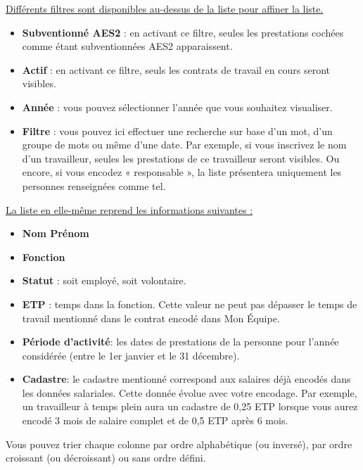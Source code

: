 \begin{info}
\underline{Différents filtres sont disponibles au-dessus de la liste pour affiner la liste.} 
\begin{itemize}
    \item \textbf{Subventionné AES2 }: en activant ce filtre, seules les prestations cochées comme étant subventionnées AES2 apparaissent.
    \item \textbf{Actif} : en activant ce filtre, seuls les contrats de travail en cours seront visibles.
    \item \textbf{Année} : vous pouvez sélectionner l’année que vous souhaitez visualiser.
    \item \textbf{Filtre} : vous pouvez ici effectuer une recherche sur base d’un mot, d’un groupe de mots ou même d’une date. Par exemple, si vous inscrivez le nom d’un travailleur, seules les prestations de ce travailleur seront visibles. Ou encore, si vous encodez « responsable », la liste présentera uniquement les personnes renseignées comme tel.
\end{itemize}
\end{info}

\begin{info}
\underline{La liste en elle-même reprend les informations suivantes :}
\begin{itemize}
    \item \textbf{Nom Prénom}
    \item \textbf{Fonction}
    \item \textbf{Statut} : soit employé, soit volontaire.
    \item \textbf{ETP} : temps dans la fonction. Cette valeur ne peut pas dépasser le temps de travail mentionné dans le contrat encodé dans Mon Équipe. 
    \item \textbf{Période d'activité}: les dates de prestations de la personne pour l'année considérée (entre le 1er janvier et le 31 décembre). 
    \item \textbf{Cadastre}: le cadastre mentionné correspond aux salaires déjà encodés dans les données salariales. Cette donnée évolue avec votre encodage. Par exemple, un travailleur à temps plein aura un cadastre de 0,25 ETP lorsque vous aurez encodé 3 mois de salaire complet et de 0,5 ETP après 6 mois.
\end{itemize}
Vous pouvez trier chaque colonne par ordre alphabétique (ou inversé), par ordre croissant (ou décroissant) ou sans ordre défini. 
\end{info}


